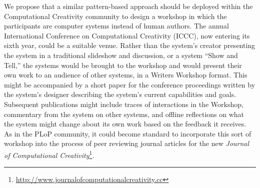 We propose that a similar pattern-based approach should be deployed
within the Computational Creativity community to design a workshop in
which the participants are computer systems instead of human authors.
The annual International Conference on Computational Creativity
(ICCC), now entering its sixth year, could be a suitable venue.
Rather than the system's creator presenting the system in a
traditional slideshow and discussion, or a system ``Show and Tell,''
the systems would be brought to the workshop and would present their
own work to an audience of other systems, in a Writers Workshop
format.  This might be accompanied by a short paper for the conference
proceedings written by the system's designer describing the system's
current capabilities and goals.  Subsequent publications might include
traces of interactions in the Workshop, commentary from the system on
other systems, and offline reflections on what the system might change
about its own work based on the feedback it receives.  As in the PLoP
community, it could become standard to incorporate this sort of workshop
into the process of peer reviewing journal articles for the new \emph{Journal of
  Computational Creativity}\footnote{\url{http://www.journalofcomputationalcreativity.cc}}.


